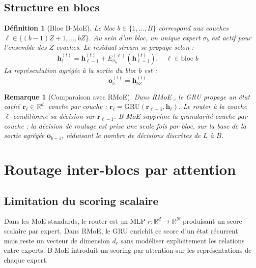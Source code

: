 \documentclass[10pt,a4paper]{article}
\newtheorem{definition}{Définition}
\newtheorem{remark}{Remarque}
\begin{document}
\subsection{Structure en blocs}

\begin{definition}[Bloc B-MoE]
Le bloc $b \in \{1, \ldots, B\}$ correspond aux couches $\ell \in \{(b-1)Z+1, \ldots, bZ\}$. Au sein d'un bloc, un unique expert $\sigma_b$ est actif pour l'ensemble des $Z$ couches. Le residual stream se propage selon :
\begin{equation}
  \mathbf{h}_\ell^{(t)} = \mathbf{h}_{\ell-1}^{(t)} + E_{\sigma_b}^{(\ell)}\!\left(\mathbf{h}_{\ell-1}^{(t)}\right), \quad \ell \in \text{bloc } b
\end{equation}
La représentation agrégée à la sortie du bloc $b$ est :
\begin{equation}
  \mathbf{o}_b^{(t)} = \mathbf{h}_{bZ}^{(t)}
\end{equation}
\end{definition}

\begin{remark}[Comparaison avec RMoE]
Dans RMoE \cite{qiu2025rmoe}, le GRU propage un état caché $\mathbf{r}_\ell \in \mathbb{R}^{d_r}$ couche par couche : $\mathbf{r}_\ell = \mathrm{GRU}(\mathbf{r}_{\ell-1}, \mathbf{h}_\ell)$. Le router à la couche $\ell$ conditionne sa décision sur $\mathbf{r}_{\ell-1}$. B-MoE supprime la granularité couche-par-couche : la décision de routage est prise une seule fois par bloc, sur la base de la sortie agrégée $\mathbf{o}_{b-1}$, réduisant le nombre de décisions discrètes de $L$ à $B$.
\end{remark}

\section{Routage inter-blocs par attention}

\subsection{Limitation du scoring scalaire}

Dans les MoE standards, le router est un MLP $r : \mathbb{R}^d \to \mathbb{R}^N$ produisant un score scalaire par expert. Dans RMoE, le GRU enrichit ce score d'un état récurrent mais reste un vecteur de dimension $d_r$ sans modéliser explicitement les relations entre experts. B-MoE introduit un scoring par attention sur les représentations de chaque expert.
\end{document}
